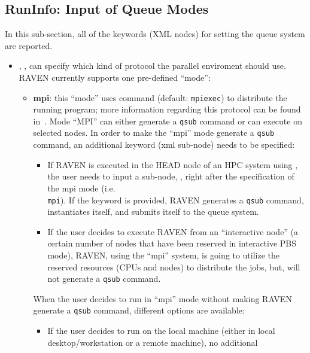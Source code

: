 \subsection{RunInfo: Input of Queue Modes}
\label{subsec:runinfoModes}
In this sub-section, all of the keywords (XML nodes) for setting the queue
system are reported.
\begin{itemize}
\item {}, , can specify which kind
of protocol the parallel enviroment should use.
%
RAVEN currently supports one pre-defined ``mode'':
  \begin{itemize}
    \item \textbf{mpi}: this ``mode'' uses   command (default: \texttt{mpiexec}) 
      to distribute the running program; more information regarding this protocol can be found
      in~\cite{MPI}.
      Mode ``MPI''  can either generate a \texttt{qsub} command or can execute
      on selected nodes.
      In order to make the ``mpi'' mode generate a \texttt{qsub} command, an
      additional keyword (xml sub-node) needs to be specified:
         \begin{itemize}
         \item If RAVEN is executed in the HEAD node of an HPC system using
           \cite{PBS}, the user needs to input a sub-node, ,
           right after the specification of the mpi mode (i.e.\\
             \texttt{mpi}).
             If the keyword is provided, RAVEN generates a \texttt{qsub}
             command, instantiates itself, and submits itself to the queue
             system.
           \item If the user decides to execute RAVEN from an ``interactive
             node'' (a certain number of nodes that have been reserved in
             interactive PBS mode), RAVEN, using the ``mpi'' system, is going to
             utilize the reserved resources (CPUs and nodes) to distribute the
             jobs, but, will not generate a \texttt{qsub} command.
         \end{itemize}
     When the user decides to run in ``mpi'' mode without making RAVEN generate
     a \texttt{qsub} command, different options are available:
      \begin{itemize}
           \item If the user decides to run on the local machine (either in
             local desktop/workstation or a remote machine), no additional

\end{itemize}
\end{itemize}
\end{itemize}

